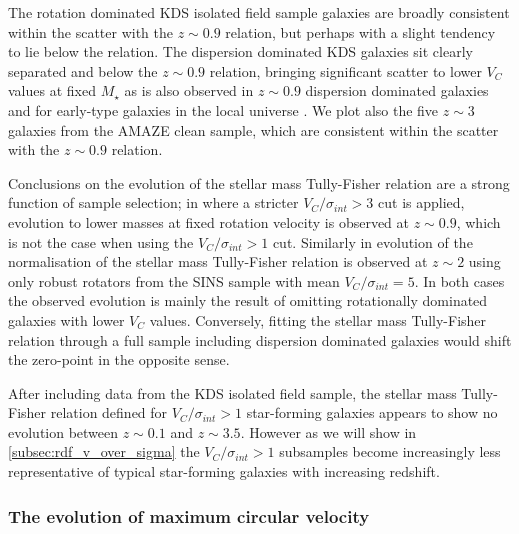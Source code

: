 \documentclass[fleqn,usenatbib]{mn2e}
\begin{document}
The rotation dominated KDS isolated field sample galaxies are broadly consistent within the scatter with the $z\sim 0.9$ relation, but perhaps with a slight tendency to lie below the relation.
The dispersion dominated KDS galaxies sit clearly separated and below the $z\sim0.9$ relation, bringing significant scatter to lower $V_{C}$ values at fixed $M_{\star}$ as is also observed in $z\sim0.9$ dispersion dominated galaxies and for early-type galaxies in the local universe \citep[e.g.][]{Romanowsky2012}. 
We plot also the five $z\sim3$ galaxies from the AMAZE clean sample, which are consistent within the scatter with the $z\sim0.9$ relation.

Conclusions on the evolution of the stellar mass Tully-Fisher relation are a strong function of sample selection; in \cite{Tiley2016a} where a stricter $V_{C}/\sigma_{int} > 3$ cut is applied, evolution to lower masses at fixed rotation velocity is observed at $z\sim0.9$, which is not the case when using the $V_{C}/\sigma_{int} > 1$ cut.
Similarly in \cite{Cresci2009} evolution of the normalisation of the stellar mass Tully-Fisher relation is observed at $z\sim2$ using only robust rotators from the SINS sample with mean $V_{C}/\sigma_{int} = 5$.
In both cases the observed evolution is mainly the result of omitting rotationally dominated galaxies with lower $V_{C}$ values.
Conversely, fitting the stellar mass Tully-Fisher relation through a full sample including dispersion dominated galaxies would shift the zero-point in the opposite sense.

After including data from the KDS isolated field sample, the stellar mass Tully-Fisher relation defined for $V_{C}/\sigma_{int} > 1$ star-forming galaxies appears to show no evolution between $z\sim0.1$ and $z\sim3.5$.
However as we will show in \cref{subsec:rdf_v_over_sigma} the $V_{C}/\sigma_{int} > 1$ subsamples become increasingly less representative of typical star-forming galaxies with increasing redshift.  

\subsubsection{The evolution of maximum circular velocity}\label{subsubsec:v_evolution}
\end{document}
